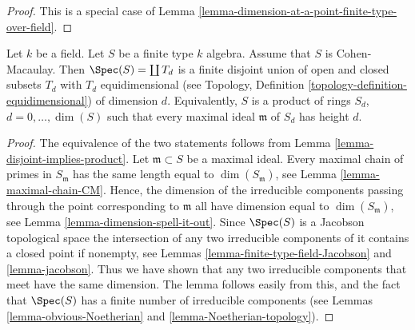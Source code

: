 \begin{proof}
This is a special case of
Lemma \ref{lemma-dimension-at-a-point-finite-type-over-field}.
\end{proof}

\begin{lemma}
\label{lemma-disjoint-decomposition-CM-algebra}
Let $k$ be a field.
Let $S$ be a finite type $k$ algebra.
Assume that $S$ is Cohen-Macaulay.
Then $\Spec(S) = \coprod T_d$ is a finite disjoint union of
open and closed subsets $T_d$ with $T_d$ equidimensional
(see Topology, Definition \ref{topology-definition-equidimensional})
of dimension $d$. Equivalently, $S$ is a product of rings
$S_d$, $d = 0, \ldots, \dim(S)$ such that every maximal ideal
$\mathfrak m$ of $S_d$ has height $d$.
\end{lemma}

\begin{proof}
The equivalence of the two statements follows from
Lemma \ref{lemma-disjoint-implies-product}.
Let $\mathfrak m \subset S$ be a maximal ideal.
Every maximal chain of primes in $S_{\mathfrak m}$ has
the same length equal to $\dim(S_{\mathfrak m})$, see
Lemma \ref{lemma-maximal-chain-CM}. Hence, the dimension of the irreducible
components passing through the point corresponding to $\mathfrak m$
all have dimension equal to $\dim(S_{\mathfrak m})$, see
Lemma \ref{lemma-dimension-spell-it-out}.
Since $\Spec(S)$ is a Jacobson topological space
the intersection
of any two irreducible components of it contains a closed point if nonempty,
see
Lemmas \ref{lemma-finite-type-field-Jacobson} and
\ref{lemma-jacobson}.
Thus we have shown that any two irreducible components
that meet have the same dimension. The lemma follows
easily from this, and the fact that $\Spec(S)$
has a finite number of irreducible components (see
Lemmas \ref{lemma-obvious-Noetherian} and \ref{lemma-Noetherian-topology}).
\end{proof}
















